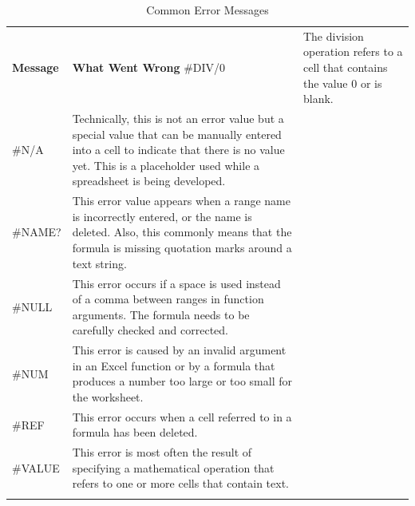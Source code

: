 \begin{table}[H]
	{\small
		\begin{longtable}{L{0.60in}L{3.65in}} %
			\textbf{Message} & \textbf{What Went Wrong} \endhead
			\hline
			\#DIV/$ 0 $ & The division operation refers to a cell that contains the value $ 0 $ or is blank.\\
			\#N/A & Technically, this is not an error value but a special value 		that can be manually entered into a cell to indicate that there is no value yet. This is a placeholder used while a spreadsheet is being developed.\\
			\#NAME? & This error value appears when a range name is incorrectly entered, or the name is deleted. Also, this commonly means that the formula is missing quotation marks around a text string.\\
			\#NULL & This error occurs if a space is used instead of a comma between ranges in function arguments. The formula needs to be carefully checked and corrected.\\
			\#NUM & This error is caused by an invalid argument in an Excel	function or by a formula that produces a number too large or too small for the worksheet.\\
			\#REF & This error occurs when a cell referred to in a formula has been deleted.\\
			\#VALUE & This error is most often the result of specifying a mathematical operation that refers to one or more cells that contain text.\\
			\caption{Common Error Messages}
			\label{03:tab01}
		\end{longtable}
	} %
\end{table}

